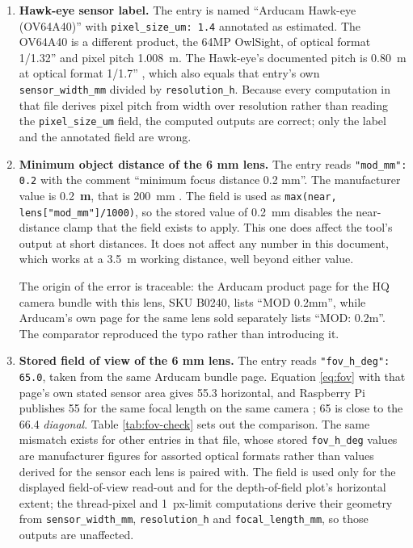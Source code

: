 \begin{enumerate}
    \item \textbf{Hawk-eye sensor label.} The entry is named ``Arducam Hawk-eye (OV64A40)'' with \texttt{pixel\_size\_um: 1.4} annotated as estimated. The OV64A40 is a different product, the 64MP OwlSight, of optical format 1/1.32'' and pixel pitch 1.008~\textmu m. The Hawk-eye's documented pitch is 0.80~\textmu m at optical format 1/1.7'' \cite{arducam_hawkeye_wiki}, which also equals that entry's own \texttt{sensor\_width\_mm} divided by \texttt{resolution\_h}. Because every computation in that file derives pixel pitch from width over resolution rather than reading the \texttt{pixel\_size\_um} field, the computed outputs are correct; only the label and the annotated field are wrong.
    \item \textbf{Minimum object distance of the 6 mm lens.} The entry reads \texttt{"mod\_mm": 0.2} with the comment ``minimum focus distance 0.2 mm''. The manufacturer value is 0.2~\textbf{m}, that is 200~mm \cite{raspberrypi_camera_docs}. The field is used as \texttt{max(near, lens["mod\_mm"]/1000)}, so the stored value of 0.2~mm disables the near-distance clamp that the field exists to apply. This one does affect the tool's output at short distances. It does not affect any number in this document, which works at a 3.5~m working distance, well beyond either value.

    The origin of the error is traceable: the Arducam product page for the HQ camera bundle with this lens, SKU B0240, lists ``MOD 0.2mm'', while Arducam's own page for the same lens sold separately lists ``MOD: 0.2m''. The comparator reproduced the typo rather than introducing it.

    \item \textbf{Stored field of view of the 6 mm lens.} The entry reads \texttt{"fov\_h\_deg": 65.0}, taken from the same Arducam bundle page. Equation \ref{eq:fov} with that page's own stated sensor area gives 55.3\textdegree{} horizontal, and Raspberry Pi publishes 55\textdegree{} for the same focal length on the same camera \cite{raspberrypi_camera_docs}; 65\textdegree{} is close to the 66.4\textdegree{} \emph{diagonal}. Table \ref{tab:fov-check} sets out the comparison. The same mismatch exists for other entries in that file, whose stored \texttt{fov\_h\_deg} values are manufacturer figures for assorted optical formats rather than values derived for the sensor each lens is paired with. The field is used only for the displayed field-of-view read-out and for the depth-of-field plot's horizontal extent; the thread-pixel and 1~px-limit computations derive their geometry from \texttt{sensor\_width\_mm}, \texttt{resolution\_h} and \texttt{focal\_length\_mm}, so those outputs are unaffected.
\end{enumerate}

